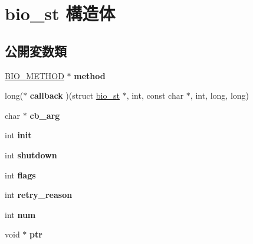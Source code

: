 \hypertarget{structbio__st}{}\section{bio\+\_\+st 構造体}
\label{structbio__st}
\subsection*{公開変数類}
\begin{DoxyCompactItemize}
\item 
\hypertarget{structbio__st_ac4bef031359b51902ddfb2a7aeaa4dd7}{}\hyperlink{structbio__method__st}{B\+I\+O\+\_\+\+M\+E\+T\+H\+O\+D} $\ast$ {\bfseries method}\label{structbio__st_ac4bef031359b51902ddfb2a7aeaa4dd7}

\item 
\hypertarget{structbio__st_a6449aab690198cbecb3bc45d9cbf59ac}{}long($\ast$ {\bfseries callback} )(struct \hyperlink{structbio__st}{bio\+\_\+st} $\ast$, int, const char $\ast$, int, long, long)\label{structbio__st_a6449aab690198cbecb3bc45d9cbf59ac}

\item 
\hypertarget{structbio__st_a50cdd0a5e46c7253bc6ab1cb37abeaca}{}char $\ast$ {\bfseries cb\+\_\+arg}\label{structbio__st_a50cdd0a5e46c7253bc6ab1cb37abeaca}

\item 
\hypertarget{structbio__st_a365cca316f1daf354096eec7dbf98102}{}int {\bfseries init}\label{structbio__st_a365cca316f1daf354096eec7dbf98102}

\item 
\hypertarget{structbio__st_adafdb3d0f58c31b776525ddceec5068b}{}int {\bfseries shutdown}\label{structbio__st_adafdb3d0f58c31b776525ddceec5068b}

\item 
\hypertarget{structbio__st_aa815fc844603d4a3fcf7abebfeb3f546}{}int {\bfseries flags}\label{structbio__st_aa815fc844603d4a3fcf7abebfeb3f546}

\item 
\hypertarget{structbio__st_a4c3a2c24d7c41e8887762750b213e9f0}{}int {\bfseries retry\+\_\+reason}\label{structbio__st_a4c3a2c24d7c41e8887762750b213e9f0}

\item 
\hypertarget{structbio__st_a3b769c998195a0f139bc68e1a36aaf09}{}int {\bfseries num}\label{structbio__st_a3b769c998195a0f139bc68e1a36aaf09}

\item 
\hypertarget{structbio__st_ad59e7884d7949dd931c76ac0d84c2ea5}{}void $\ast$ {\bfseries ptr}\label{structbio__st_ad59e7884d7949dd931c76ac0d84c2ea5}


\end{DoxyCompactItemize}
